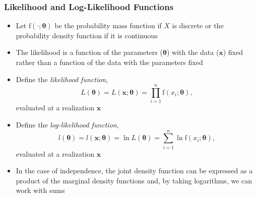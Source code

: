 \documentclass{beamer}
\begin{document}
\begin{frame}%
\frametitle{Likelihood and Log-Likelihood Functions}
\begin{itemize}
\item Let $\mathrm{f}(\cdot;\boldsymbol\theta)$ be the probability mass function if $X$ is discrete or the probability density function if it is continuous %

\item The likelihood is a function of the parameters ($\boldsymbol \theta$) with the data ($\mathbf{x}$)  fixed rather than a function of the data with the parameters fixed %

\item Define the \emph{likelihood function},
\begin{equation*}
L(\boldsymbol \theta) = L(\mathbf{x};\boldsymbol \theta ) =
\prod_{i=1}^n \mathrm{f}(x_i;\boldsymbol \theta),
\end{equation*}
evaluated at a realization $\mathbf{x}$ %

\item Define the \emph{log-likelihood function},
\begin{equation*}
l(\boldsymbol \theta) = l(\mathbf{x};\boldsymbol \theta ) = \ln
L(\boldsymbol \theta) = \sum_{i=1}^n \ln \mathrm{f}(x_i;\boldsymbol
\theta),
\end{equation*}
evaluated at a realization $\mathbf{x}$ %

\item In the case of independence, the joint density function can be expressed as a product of the marginal
density functions and, by taking logarithms, we can work with sums

\end{itemize}
\end{frame}
\end{document}
